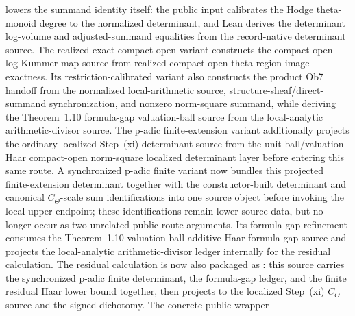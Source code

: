 \begin{proposition}
  lowers the summand identity itself: the public input calibrates the Hodge
  theta-monoid degree to the normalized determinant, and Lean derives the
  determinant log-volume and adjusted-summand equalities from the
  record-native determinant source.
  The realized-exact compact-open variant
  constructs the compact-open log-Kummer map source from realized
  compact-open theta-region image exactness.
  Its restriction-calibrated variant
  also constructs the product Ob7 handoff from the normalized local-arithmetic
  source, structure-sheaf/direct-summand synchronization, and nonzero
  norm-square summand, while deriving the Theorem~1.10 formula-gap
  valuation-ball source from the local-analytic arithmetic-divisor source.
  The p-adic finite-extension variant additionally projects the ordinary
  localized Step~(xi) determinant source from the unit-ball/valuation-Haar
  compact-open norm-square localized determinant layer before entering this
  same route.  A synchronized p-adic finite variant now bundles this projected
  finite-extension determinant together with the constructor-built determinant
  and canonical \(C_\Theta\)-scale sum identifications into one source object
  before invoking the local-upper endpoint; these identifications remain lower
  source data, but no longer occur as two unrelated public route arguments.
  Its formula-gap refinement consumes the Theorem~1.10 valuation-ball
  additive-Haar formula-gap source and projects the local-analytic
  arithmetic-divisor ledger internally for the residual calculation.
  The residual calculation is now also packaged as
  :
  this source carries the synchronized p-adic finite determinant, the
  formula-gap ledger, and the finite residual Haar lower bound together, then
  projects to the localized Step~(xi) \(C_\Theta\) source and the signed
  dichotomy.  The concrete public wrapper

\end{proposition}

